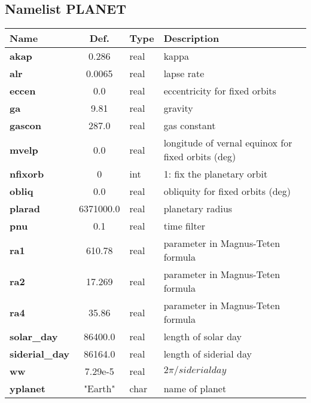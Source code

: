\subsection{Namelist PLANET}
\begin{tabular}{|l|c|l|l|}                                  
\hline                                                        
{\bf Name      }&Def.&Type & Description \\               
\hline                                                        
{\bf akap         } & 0.286 & real & kappa \\
{\bf alr          } & 0.0065 & real & lapse rate \\
{\bf eccen        } & 0.0  & real & eccentricity for fixed orbits \\
{\bf ga           } & 9.81 & real & gravity \\
{\bf gascon       } & 287.0 & real & gas constant \\
{\bf mvelp        } & 0.0  & real & longitude of vernal equinox for fixed orbits (deg) \\
{\bf nfixorb      } & 0   & int & 1: fix the planetary orbit \\
{\bf obliq        } & 0.0  & real & obliquity for fixed orbits (deg) \\
{\bf plarad       } & 6371000.0 & real & planetary radius \\
{\bf pnu          } & 0.1 & real & time filter \\
{\bf ra1          } & 610.78 & real & parameter in Magnus-Teten formula \\
{\bf ra2          } & 17.269 & real & parameter in Magnus-Teten formula \\
{\bf ra4          } & 35.86 & real & parameter in Magnus-Teten formula \\
{\bf solar\_day   } & 86400.0 & real & length of solar day \\
{\bf siderial\_day} & 86164.0 & real & length of siderial day \\
{\bf ww           } & 7.29e-5 & real & $ 2 \pi / siderial day $ \\
{\bf yplanet      } & "Earth" & char & name of planet \\
\hline                                                        
\end{tabular}


